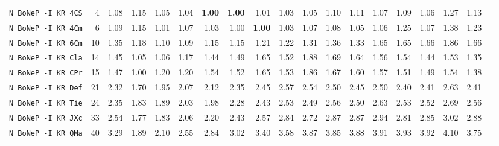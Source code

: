 \begin{tabular}{l | r @{~~} r | r@{~~}r@{~~}r@{~~}r@{~~}r@{~~}r@{~~}r@{~~}r@{~~}r@{~~}r@{~~}r@{~~}r@{~~}r@{~~}r@{~~}r@{~~}r|}
\verb+N BoNeP -I KR 4CS+ & 4 & 1.08 & 1.15&1.05&1.04&\textbf{1.00}&\textbf{1.00}&1.01&1.03&1.05&1.10&1.11&1.07&1.09&1.06&1.27&1.13\\
\verb+N BoNeP -I KR 4Cm+ & 6 & 1.09 & 1.15&1.01&1.07&1.03&1.00&\textbf{1.00}&1.03&1.07&1.08&1.05&1.06&1.25&1.07&1.38&1.23\\
\verb+N BoNeP -I KR 6Cm+ & 10 & 1.35 & 1.18&1.10&1.09&1.15&1.15&1.21&1.22&1.31&1.36&1.33&1.65&1.65&1.66&1.86&1.66\\
\verb+N BoNeP -I KR Cla+ & 14 & 1.45 & 1.05&1.06&1.17&1.44&1.49&1.65&1.52&1.88&1.69&1.64&1.56&1.54&1.44&1.53&1.35\\
\verb+N BoNeP -I KR CPr+ & 15 & 1.47 & 1.00&1.20&1.20&1.54&1.52&1.65&1.53&1.86&1.67&1.60&1.57&1.51&1.49&1.54&1.38\\
\verb+N BoNeP -I KR Def+ & 21 & 2.32 & 1.70&1.95&2.07&2.12&2.35&2.45&2.57&2.54&2.50&2.45&2.50&2.40&2.41&2.63&2.41\\
\verb+N BoNeP -I KR Tie+ & 24 & 2.35 & 1.83&1.89&2.03&1.98&2.28&2.43&2.53&2.49&2.56&2.50&2.63&2.53&2.52&2.69&2.56\\
\verb+N BoNeP -I KR JXc+ & 33 & 2.54 & 1.77&1.83&2.06&2.20&2.43&2.57&2.84&2.72&2.87&2.87&2.94&2.81&2.85&3.02&2.88\\
\verb+N BoNeP -I KR QMa+ & 40 & 3.29 & 1.89&2.10&2.55&2.84&3.02&3.40&3.58&3.87&3.85&3.88&3.91&3.93&3.92&4.10&3.75\\
\end{tabular}
